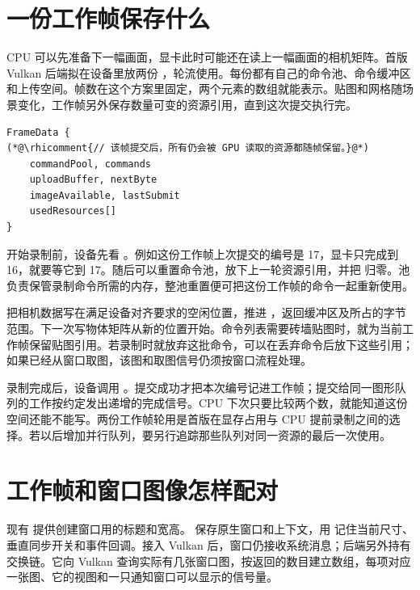 \clearpage
\section{一份工作帧保存什么}\label{sec:data-frame}
CPU 可以先准备下一幅画面，显卡此时可能还在读上一幅画面的相机矩阵。首版 Vulkan 后端拟在设备里放两份 ，轮流使用。每份都有自己的命令池、命令缓冲区和上传空间。帧数在这个方案里固定，两个元素的数组就能表示。贴图和网格随场景变化，工作帧另外保存数量可变的资源引用，直到这次提交执行完。

\begin{lstlisting}
FrameData {
(*@\rhicomment{// 该帧提交后，所有仍会被 GPU 读取的资源都随帧保留。}@*)
    commandPool, commands
    uploadBuffer, nextByte
    imageAvailable, lastSubmit
    usedResources[]
}
\end{lstlisting}

开始录制前，设备先看 。例如这份工作帧上次提交的编号是 17，显卡只完成到 16，就要等它到 17。随后可以重置命令池，放下上一轮资源引用，并把  归零。池负责保管录制命令所需的内存，整池重置便可把这份工作帧的命令一起重新使用。

 把相机数据写在满足设备对齐要求的空闲位置，推进 ，返回缓冲区及所占的字节范围。下一次写物体矩阵从新的位置开始。命令列表需要砖墙贴图时，就为当前工作帧保留贴图引用。若录制时就放弃这批命令，可以在丢弃命令后放下这些引用；如果已经从窗口取图，该图和取图信号仍须按窗口流程处理。

录制完成后，设备调用 。提交成功才把本次编号记进工作帧；提交给同一图形队列的工作按约定发出递增的完成信号。CPU 下次只要比较两个数，就能知道这份空间还能不能写。两份工作帧轮用是首版在显存占用与 CPU 提前录制之间的选择。若以后增加并行队列，要另行追踪那些队列对同一资源的最后一次使用。


\clearpage
\section{工作帧和窗口图像怎样配对}\label{sec:data-window}
现有  提供创建窗口用的标题和宽高。 保存原生窗口和上下文，用  记住当前尺寸、垂直同步开关和事件回调。接入 Vulkan 后，窗口仍接收系统消息；后端另外持有交换链。它向 Vulkan 查询实际有几张窗口图，按返回的数目建立数组，每项对应一张图、它的视图和一只通知窗口可以显示的信号量。


